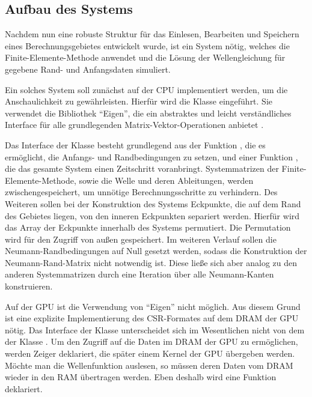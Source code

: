 \documentclass[crop=false,10pt,ngerman]{standalone}
\begin{document}
    \subsection{Aufbau des Systems} %
    \label{sub:aufbau_des_systems}
      Nachdem nun eine robuste Struktur für das Einlesen, Bearbeiten und Speichern eines Berechnungsgebietes entwickelt wurde, ist ein System nötig, welches die Finite-Elemente-Methode anwendet und die Lösung der Wellengleichung für gegebene Rand- und Anfangsdaten simuliert.

      Ein solches System soll zunächst auf der CPU implementiert werden, um die Anschaulichkeit zu gewährleisten.
      Hierfür wird die Klasse  eingeführt.
      Sie verwendet die Bibliothek \enquote{Eigen}, die ein abstraktes und leicht verständliches Interface für alle grundlegenden Matrix-Vektor-Operationen anbietet \cite{Eigen2018}.


      Das Interface der Klasse  besteht grundlegend aus der Funktion , die es ermöglicht, die Anfangs- und Randbedingungen zu setzen, und einer Funktion , die das gesamte System einen Zeitschritt voranbringt.
      Systemmatrizen der Finite-Elemente-Methode, sowie die Welle und deren Ableitungen, werden zwischengespeichert, um unnötige Berechnungsschritte zu verhindern.
      Des Weiteren sollen bei der Konstruktion des Systems Eckpunkte, die auf dem Rand des Gebietes liegen, von den inneren Eckpunkten separiert werden.
      Hierfür wird das Array der Eckpunkte innerhalb des Systems permutiert.
      Die Permutation wird für den Zugriff von außen gespeichert.
      Im weiteren Verlauf sollen die Neumann-Randbedingungen auf Null gesetzt werden, sodass die Konstruktion der Neumann-Rand-Matrix nicht notwendig ist.
      Diese ließe sich aber analog zu den anderen Systemmatrizen durch eine Iteration über alle Neumann-Kanten konstruieren.

      Auf der GPU ist die Verwendung von \enquote{Eigen} nicht möglich.
      Aus diesem Grund ist eine explizite Implementierung des CSR-Formates auf dem DRAM der GPU nötig.
      Das Interface der Klasse  unterscheidet sich im Wesentlichen nicht von dem der Klasse .
      Um den Zugriff auf die Daten im DRAM der GPU zu ermöglichen, werden Zeiger deklariert, die später einem Kernel der GPU übergeben werden.
      Möchte man die Wellenfunktion auslesen, so müssen deren Daten vom DRAM wieder in den RAM übertragen werden.
      Eben deshalb wird eine Funktion  deklariert.
\end{document}
